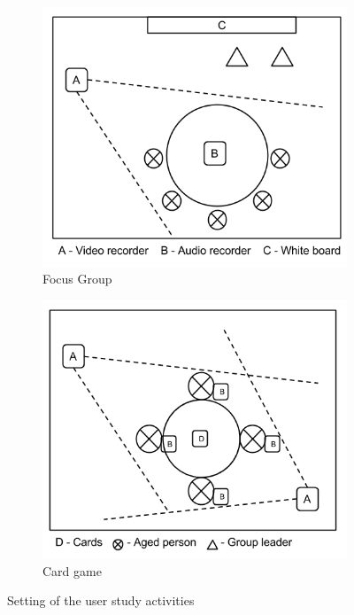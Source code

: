 \begin{figure}
        \centering
        \begin{subfigure}[h]{0.49\textwidth}
                \includegraphics[width=\textwidth]{./img/focusGroup}
                \caption{Focus Group}
                \label{fig:focus-group}
        \end{subfigure}
        \begin{subfigure}[h]{0.49\textwidth}
                \includegraphics[width=\textwidth]{./img/cardGame}
                \caption{Card game}
                \label{fig:card-game}
        \end{subfigure}
        \caption{Setting of the user study activities}\label{fig:user-studies}
\end{figure}


